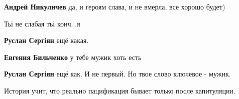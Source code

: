 \begin{itemize}
\begin{itemize}
\textbf{Андрей Никуличев} да, и героям слава, и не вмерла, все хорошо будет)
\end{itemize}

 
Тьі не слабая тьі конч...я 🤣

\begin{itemize}
 
\textbf{Руслан Сергіян} ещё какая.

 
\textbf{Евгения Бильченко} у тебе мужик хоть есть 🤣

 
\textbf{Руслан Сергіян} ещё как. И не первый. Но твое слово ключевое - мужик.
\end{itemize}

 
История учит, что реально пацификация бывает только после капитуляции.

\begin{itemize}
 

\end{itemize}
\end{itemize}
